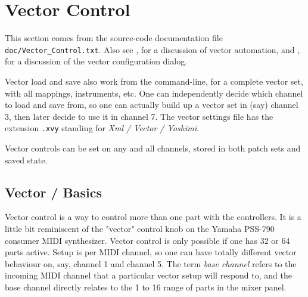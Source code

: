 %
%
%

\section{Vector Control}
\label{sec:vector}

   This section comes from the source-code documentation file
   \texttt{doc/Vector\_Control.txt}.
   Also see
   , for a discussion
   of vector automation, and
   , for a discussion of the vector
   configuration dialog.

   Vector load and save also work from the command-line, for a complete vector
   set, with all mappings, instruments, etc.
   One can independently decide which
   channel to load and save from, so one can actually build up a vector set in
   (say) channel 3, then later decide to use it in channel 7.
   The vector settings file
   has the extension \texttt{.xvy} standing for
   \textsl{Xml / Vector / Yoshimi}.

   Vector controls can be set on any and all channels,
   stored in both patch sets and saved state.

\subsection{Vector / Basics}
\label{subsection:vector_basics}

   Vector control is a way to control more than one part with the controllers.
   It is a little bit reminiscent of the "vector" control knob on the Yamaha
   PSS-790 consumer MIDI synthesizer.  Vector control is only possible if one
   has 32 or 64 parts active.  Setup is per MIDI channel, so one can have
   totally different vector behaviour on, say, channel 1 and channel 5.
    The term \textsl{base channel} refers to the
   incoming MIDI channel that a particular vector setup will respond to, and
   the base channel directly relates to the 1 to 16 range of parts in the mixer
   panel.

